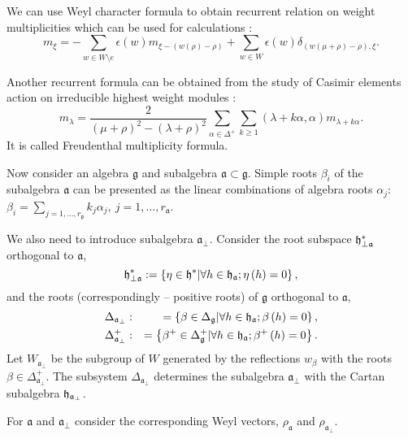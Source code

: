 \documentclass[preprint,12pt]{elsarticle}
\newcommand{\gf}{\mathfrak{g}}
\newcommand{\af}{\mathfrak{a}}
\newcommand{\afb}{\mathfrak{a}_{\bot}}
\begin{document}
We can use Weyl character formula to obtain recurrent relation on weight multiplicities which can be used for calculations \cite{il2010folded,kulish4sfa}:
\begin{equation}
\label{eq:14}
m_{\xi }=-\sum_{w\in W\setminus e}\epsilon (w)m_{\xi
-\left( w(\rho )-\rho \right) }+\sum_{w\in W}\epsilon
(w)\delta _{\left( w(\mu +\rho )-\rho \right) ,\xi }.  
\end{equation}

Another recurrent formula can be obtained from the study of Casimir elements action on irreducible highest weight modules \cite{humphreys1997introduction}:
\begin{equation}
  \label{eq:15}
  m_{\lambda}=\frac{2}{(\mu+\rho)^{2}-(\lambda+\rho)^{2}}\sum_{\alpha\in \Delta^{+}}\sum_{k\geq 1} (\lambda+k\alpha,\alpha)m_{\lambda+k\alpha}.
\end{equation}
It is called Freudenthal multiplicity formula. 

Now consider an algebra $\gf$ and subalgebra $\af\subset \gf$. Simple roots $\beta_{i}$ of the subalgebra $\af$ can be presented as the linear combinations of algebra roots $\alpha_{j}$: $\beta_{i}=\sum_{j=1,\dots,r_{\gf}}k_{j} \alpha_{j},\ j=1,\dots,r_{\af}$. 

We also need to introduce subalgebra $\afb$. 
Consider the root subspace $\frak{h}_{\perp \af}^{\ast }$ orthogonal to
$\af$,
\begin{equation*}
\frak{h}_{\perp \af}^{\ast }:=\left\{ \eta \in \frak{h}^{\ast }|\forall
h\in \frak{h}_{\af};\eta \left( h\right) =0\right\} ,
\end{equation*}
and the roots (correspondingly -- positive roots) of $\gf$ orthogonal
to $\af$,
\begin{eqnarray}
\Delta _{\afb} &:&=\left\{ \beta \in \Delta _{\gf}|\forall
h\in \frak{h}_{\af};\beta \left( h\right) =0\right\} ,
\label{delta a ort} \\
\Delta _{\afb}^{+} &:&=\left\{ \beta ^{+}\in \Delta _{\gf%
}^{+}|\forall h\in \frak{h}_{\af};\beta ^{+}\left( h\right) =0\right\} .
\notag
\end{eqnarray}
Let $W_{\afb}$ be the subgroup of $W$ generated by the
reflections $w_{\beta }$ with the roots $\beta \in \Delta _{\af_{\perp
}}^{+}$. The subsystem $\Delta _{\afb}$ determines the
subalgebra $\afb$ with the Cartan subalgebra $\frak{h}_{\af%
_{\perp }}$. 

For $\af$ and $\afb$ consider the
corresponding Weyl vectors, $\rho _{\af}$ and $\rho _{\af_{\perp
}} $.
\end{document}
